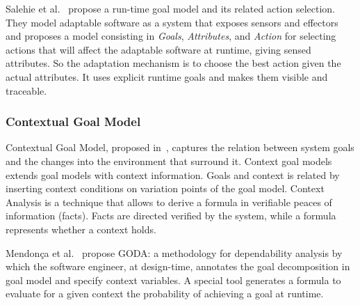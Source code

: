 Salehie et al.~\cite{salehie_towards_2012} propose a run-time goal model and its related action selection. They model adaptable software as a system that exposes sensors and effectors and proposes a model consisting in \emph{Goals}, \emph{Attributes}, and \emph{Action} for selecting actions that will affect the adaptable software at runtime, giving sensed attributes.
So the adaptation mechanism is to choose the best action given the actual attributes.
It uses explicit runtime goals and makes them visible and traceable.

\subsubsection{Contextual Goal Model}

Contextual Goal Model, proposed in~\cite{ali_goal-based_2010}, captures the relation between system goals and the changes into the environment that surround it. Context goal models extends goal models with context information. Goals and context is related by inserting context conditions on variation points of the goal model. Context Analysis is a technique that allows to derive a formula in verifiable peaces of information (facts). Facts are directed verified by the system, while a formula represents whether a context holds.

Mendonça et al.~\cite{mendonca_dependability_2015} propose GODA: a methodology  for dependability analysis by which the software engineer, at design-time, annotates the goal decomposition in goal model and specify context variables. A special tool generates a formula to evaluate for a given context the probability of achieving a goal at runtime.
